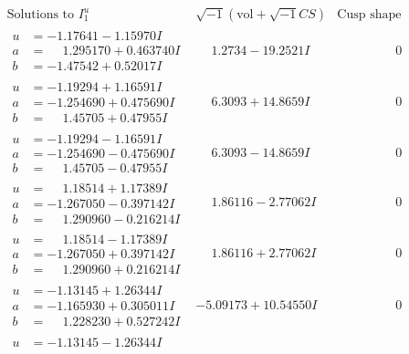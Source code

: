 \documentclass[1p]{elsarticle_modified}
\theoremstyle{definition}
\newcommand{\I}{\sqrt{-1}}
\begin{document}
$$\begin{array}{c|c|c}
\text{Solutions to }I^u_{1}& \I (\text{vol} + \sqrt{-1}CS) & \text{Cusp shape}\\
 \hline 
\begin{aligned}
u &= -1.17641 - 1.15970 I \\
a &= \phantom{-}1.295170 + 0.463740 I \\
b &= -1.47542 + 0.52017 I\end{aligned}
 & \phantom{-}1.2734 - 19.2521 I & \phantom{-0.000000 } 0 \\ \hline\begin{aligned}
u &= -1.19294 + 1.16591 I \\
a &= -1.254690 + 0.475690 I \\
b &= \phantom{-}1.45705 + 0.47955 I\end{aligned}
 & \phantom{-}6.3093 + 14.8659 I & \phantom{-0.000000 } 0 \\ \hline\begin{aligned}
u &= -1.19294 - 1.16591 I \\
a &= -1.254690 - 0.475690 I \\
b &= \phantom{-}1.45705 - 0.47955 I\end{aligned}
 & \phantom{-}6.3093 - 14.8659 I & \phantom{-0.000000 } 0 \\ \hline\begin{aligned}
u &= \phantom{-}1.18514 + 1.17389 I \\
a &= -1.267050 - 0.397142 I \\
b &= \phantom{-}1.290960 - 0.216214 I\end{aligned}
 & \phantom{-}1.86116 - 2.77062 I & \phantom{-0.000000 } 0 \\ \hline\begin{aligned}
u &= \phantom{-}1.18514 - 1.17389 I \\
a &= -1.267050 + 0.397142 I \\
b &= \phantom{-}1.290960 + 0.216214 I\end{aligned}
 & \phantom{-}1.86116 + 2.77062 I & \phantom{-0.000000 } 0 \\ \hline\begin{aligned}
u &= -1.13145 + 1.26344 I \\
a &= -1.165930 + 0.305011 I \\
b &= \phantom{-}1.228230 + 0.527242 I\end{aligned}
 & -5.09173 + 10.54550 I & \phantom{-0.000000 } 0 \\ \hline\begin{aligned}
u &= -1.13145 - 1.26344 I \\

\end{aligned}
\end{array}$$
\end{document}

